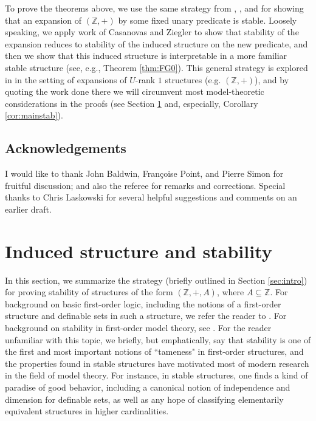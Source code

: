 \documentclass{amsart}
\def\seq{\subseteq}
\def\Z{\mathbb Z}
\theoremstyle{definition}
\begin{document}
To prove the theorems above, we use the same strategy from \cite{CoSS}, \cite{PoLa}, and \cite{PaSk} for showing that an expansion of $(\Z,+)$ by some fixed unary predicate is stable. Loosely speaking, we apply work of Casanovas and Ziegler \cite{CaZi} to show that stability of the expansion reduces to stability of the induced structure on the new predicate, and then we show that this induced structure is interpretable in a more familiar stable structure (see, e.g., Theorem \ref{thm:FG0}). This general strategy is explored in \cite{CoSS} in the setting of expansions of $U$-rank $1$ structures (e.g. $(\Z,+)$), and by quoting the work done there we will circumvent most model-theoretic considerations in the proofs (see Section \ref{sec:background} and, especially, Corollary \ref{cor:mainstab}).




\subsection*{Acknowledgements} I would like to thank John Baldwin, Fran\c{c}oise Point, and Pierre Simon for fruitful discussion; and also the referee for remarks and corrections.  Special thanks to Chris Laskowski for several helpful suggestions and comments on an earlier draft. 






\section{Induced structure and stability}\label{sec:background}

In this section, we summarize the strategy (briefly outlined in Section \ref{sec:intro}) for proving stability of structures of the form $(\Z,+,A)$, where $A\seq\Z$. For background on basic first-order logic, including the notions of a first-order structure and definable sets in such a structure, we refer the reader to \cite{Mabook}.  For background on stability in first-order model theory, see \cite{Pibook}. For the reader unfamiliar with this topic, we briefly, but emphatically, say that stability is one of the first and most important notions of ``tameness" in first-order structures, and the properties found in stable structures have motivated most of modern research in the field of model theory. For instance, in stable structures, one finds a kind of paradise of good behavior, including a canonical notion of independence and dimension for definable sets, as well as any hope of classifying elementarily equivalent structures in higher cardinalities. 
\end{document}
